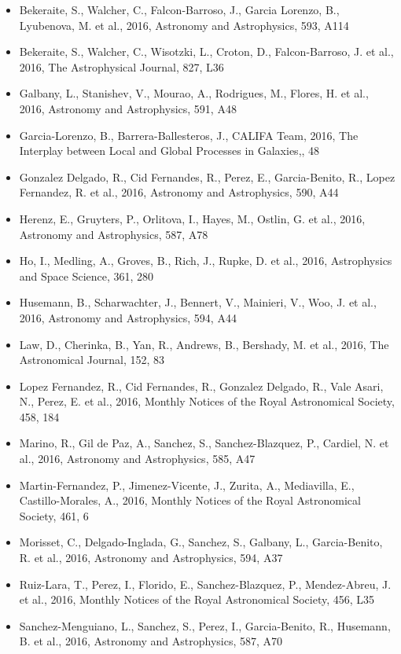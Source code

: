 \documentclass{letter}
\begin{document}
\begin{enumerate}
\begin{itemize}
\item Bekeraite, S., Walcher, C., Falcon-Barroso, J., Garcia Lorenzo, B., Lyubenova, M. et al., 2016, Astronomy and Astrophysics, 593, A114
\item Bekeraite, S., Walcher, C., Wisotzki, L., Croton, D., Falcon-Barroso, J. et al., 2016, The Astrophysical Journal, 827, L36
\item Galbany, L., Stanishev, V., Mourao, A., Rodrigues, M., Flores, H. et al., 2016, Astronomy and Astrophysics, 591, A48
\item Garcia-Lorenzo, B., Barrera-Ballesteros, J., CALIFA Team, 2016, The Interplay between Local and Global Processes in Galaxies,, 48
\item Gonzalez Delgado, R., Cid Fernandes, R., Perez, E., Garcia-Benito, R., Lopez Fernandez, R. et al., 2016, Astronomy and Astrophysics, 590, A44
\item Herenz, E., Gruyters, P., Orlitova, I., Hayes, M., Ostlin, G. et al., 2016, Astronomy and Astrophysics, 587, A78
\item Ho, I., Medling, A., Groves, B., Rich, J., Rupke, D. et al., 2016, Astrophysics and Space Science, 361, 280
\item Husemann, B., Scharwachter, J., Bennert, V., Mainieri, V., Woo, J. et al., 2016, Astronomy and Astrophysics, 594, A44
\item Law, D., Cherinka, B., Yan, R., Andrews, B., Bershady, M. et al., 2016, The Astronomical Journal, 152, 83
\item Lopez Fernandez, R., Cid Fernandes, R., Gonzalez Delgado, R., Vale Asari, N., Perez, E. et al., 2016, Monthly Notices of the Royal Astronomical Society, 458, 184
\item Marino, R., Gil de Paz, A., Sanchez, S., Sanchez-Blazquez, P., Cardiel, N. et al., 2016, Astronomy and Astrophysics, 585, A47
\item Martin-Fernandez, P., Jimenez-Vicente, J., Zurita, A., Mediavilla, E., Castillo-Morales, A., 2016, Monthly Notices of the Royal Astronomical Society, 461, 6
\item Morisset, C., Delgado-Inglada, G., Sanchez, S., Galbany, L., Garcia-Benito, R. et al., 2016, Astronomy and Astrophysics, 594, A37
\item Ruiz-Lara, T., Perez, I., Florido, E., Sanchez-Blazquez, P., Mendez-Abreu, J. et al., 2016, Monthly Notices of the Royal Astronomical Society, 456, L35
\item Sanchez-Menguiano, L., Sanchez, S., Perez, I., Garcia-Benito, R., Husemann, B. et al., 2016, Astronomy and Astrophysics, 587, A70

\end{itemize}
\end{enumerate}
\end{document}
